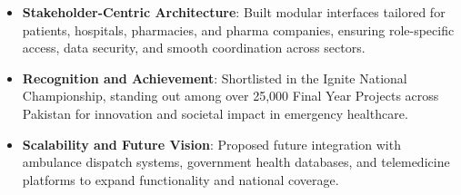 \documentclass[letterpaper,10pt]{article}
\begin{document}
{\begin{itemize}
\begin{itemize}
    \end{itemize}
    \item \textbf{Stakeholder-Centric Architecture}: Built modular interfaces tailored for patients, hospitals, pharmacies, and pharma companies, ensuring role-specific access, data security, and smooth coordination across sectors.
    \item \textbf{Recognition and Achievement}: Shortlisted in the Ignite National Championship, standing out among over 25,000 Final Year Projects across Pakistan for innovation and societal impact in emergency healthcare.
    \item \textbf{Scalability and Future Vision}: Proposed future integration with ambulance dispatch systems, government health databases, and telemedicine platforms to expand functionality and national coverage.
\end{itemize}
}
\end{document}
